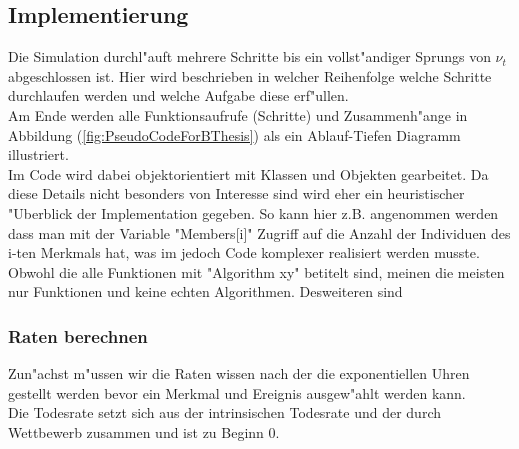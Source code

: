 \documentclass[11pt, a4paper, german]{article}
\theoremstyle{plain}
\begin{document}
	\subsection{Implementierung}
	Die Simulation durchl"auft mehrere Schritte bis ein vollst"andiger Sprungs von $ \nu_t $ abgeschlossen ist. Hier wird beschrieben in welcher Reihenfolge welche Schritte durchlaufen werden und welche Aufgabe diese erf"ullen.\\
	Am Ende werden alle Funktionsaufrufe (Schritte) und Zusammenh"ange in Abbildung (\ref{fig:PseudoCodeForBThesis}) als ein Ablauf-Tiefen Diagramm illustriert.\\
	Im Code wird dabei objektorientiert mit Klassen und Objekten gearbeitet. Da diese Details nicht besonders von Interesse sind wird eher ein heuristischer "Uberblick der Implementation gegeben. So kann hier z.B. angenommen werden dass man mit der Variable "{}Members[i]"{} Zugriff auf die Anzahl der Individuen des i-ten Merkmals hat, was im jedoch Code komplexer realisiert werden musste.\\
	Obwohl die alle Funktionen mit "{}Algorithm xy"{} betitelt sind, meinen die meisten nur Funktionen und keine echten Algorithmen. Desweiteren sind
	
	\subsubsection{Raten berechnen}	
	Zun"achst m"ussen wir die Raten wissen nach der die exponentiellen Uhren gestellt werden bevor ein Merkmal und Ereignis ausgew"ahlt werden kann.\\
	Die Todesrate setzt sich aus der intrinsischen Todesrate und der durch Wettbewerb zusammen und ist zu Beginn 0.\\
	
\end{document}
